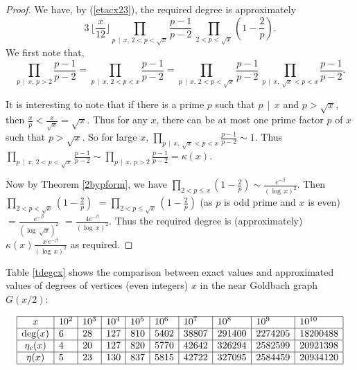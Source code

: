 \documentclass[11pt]{article}
\theoremstyle{definition}
\theoremstyle{remark}
\numberwithin{equation}{section}
\newcommand{\Div}[2]{#1\,\mid\, #2}
\begin{document}
\begin{proof}
We have, by (\ref{etacx23}), the required degree is approximately
$$3\, \lfloor\frac{x}{12}\rfloor \prod\limits_{\Div{p}{x},\, 2<p<\sqrt{x}} \frac{p-1}{p-2}\ \prod\limits_{2<p< \sqrt{x}} \left( 1-\frac{2}{p}\right).$$
We first note that, 
$$\prod\limits_{\Div{p}{x},\, p>2} \frac{p-1}{p-2} = \prod\limits_{\Div{p}{x},\, 2<p<x} \frac{p-1}{p-2} = \prod\limits_{\Div{p}{x},\, 2<p<\sqrt{x}} \frac{p-1}{p-2}\, \prod\limits_{\Div{p}{x},\, \sqrt{x}<p<x} \frac{p-1}{p-2}.$$

\noindent
It is interesting to note that if there is a prime $p$ such that $\Div{p}{x}$ and $p>\sqrt{x}$, then $\frac{x}{p}<\frac{x}{\sqrt{x}}=\sqrt{x}$. Thus for any $x$, there can be at most one prime factor $p$ of $x$ such that $p>\sqrt{x}$. So for large $x$, $\prod\limits_{\Div{p}{x},\, \sqrt{x}<p<x} \frac{p-1}{p-2}\sim 1$. Thus $\prod\limits_{\Div{p}{x},\, 2<p<\sqrt{x}} \frac{p-1}{p-2}\sim \prod\limits_{\Div{p}{x},\, p>2} \frac{p-1}{p-2}=\kappa(x)$.

\vspace{1em}
\noindent
Now by Theorem \ref{2bypform}, we have $\prod\limits_{2<p\leq x} \left( 1-\frac{2}{p}\right)\sim \frac{e^{-\beta}}{(\log\, x)^2}$. Then $\prod\limits_{2<p< \sqrt{x}} \left( 1-\frac{2}{p}\right)$ $=\prod\limits_{2<p\leq \sqrt{x}} \left( 1-\frac{2}{p}\right)$ (as $p$ is odd prime and $x$ is even) $=\frac{e^{-\beta}}{(\log\, \sqrt{x})^2}$ $=\frac{4e^{-\beta}}{(\log\, x)^2}$. Thus the required degree is (approximately) $\kappa(x) \frac{x\, e^{-\beta}}{(\log\, x)^2}$ as required.
\end{proof}

\noindent
Table \ref{tdegcx} shows the comparison between exact values and approximated values of degrees of vertices (even integers) $x$ in the near Goldbach graph $G(x/2)$:

\begin{table}[ht]
$$\begin{array}{|c|l|l|l|l|l|l|l|l|l|}
\hline
x & 10^2 & 10^3 & 10^4 & 10^5 & 10^6 & 10^7 & 10^8 & 10^9 & 10^{10} \\
\hline
\text{deg}(x) & 6 & 28 & 127 & 810 & 5402 & 38807 & 291400 & 2274205 & 18200488 \\
\hline
\eta_c(x) & 4 & 20 & 127 & 820 & 5770 & 42642 & 326294 & 2582599 & 20921398 \\
\hline
\eta(x) & 5 & 23 & 130 & 837 & 5815 & 42722 & 327095 & 2584459 & 20934120\\
\hline
\end{array}$$
\caption{Comparison between exact values and approximated values of degree of $x$ in $G(x/2)$.}\label{tdegcx}
\end{table}
\end{document}
